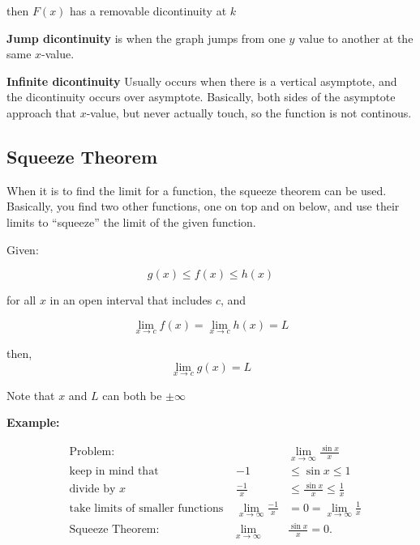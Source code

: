 \documentclass[12pt]{article}
\begin{document}
        then $F(x)$ has a removable dicontinuity at $k$

        \textbf{Jump dicontinuity} is when the graph jumps from one $y$ value to another at the 
        same $x$-value. 

        \textbf{Infinite dicontinuity} Usually occurs when there is a vertical asymptote, and the 
        dicontinuity occurs over asymptote. Basically, both sides of the asymptote approach that $x$-value, but never actually touch, 
        so the function is not continous. 

        \subsection{Squeeze Theorem}

        When it is to find the limit for a function, the squeeze theorem can be used. Basically, you find
        two other functions, one on top and on below, and use their limits to ``squeeze'' the limit of 
        the given function. 

        \noindent Given:

        \[
            g(x) \le f(x) \le h(x) 
        \]

        \noindent for all $x$ in an open interval that includes $c$, and 

        \[
            \lim_{x \to c} f(x) = \lim_{x \to c} h(x) = L    
        \]
        
        \noindent then,
        \[
            \lim_{x \to c} g(x) = L
        \]
        
        \noindent Note that $x$ and $L$ can both be $\pm\infty$

        \noindent \textbf{Example:}

        \[
            \begin{aligned}
                & \text{Problem:}                          &                                  & \lim_{x \to \infty} \frac{\sin{x}}{x} \\[6pt]
                & \text{keep in mind that}                 & -1                               & \le \sin{x} \le 1                     \\
                & \text{divide by $x$}                     & \frac{-1}{x}                     & \le \frac{\sin{x}}{x} \le \frac{1}{x} \\[6pt]
                & \text{take limits of smaller functions } & \lim_{x \to \infty} \frac{-1}{x} & = 0 = \lim_{x \to \infty} \frac{1}{x} \\[6pt]
                & \text{Squeeze Theorem:}                  & \lim_{x \to \infty}              & \frac{\sin{x}}{x} = 0.
                \end{aligned}    
        \]
\end{document}
